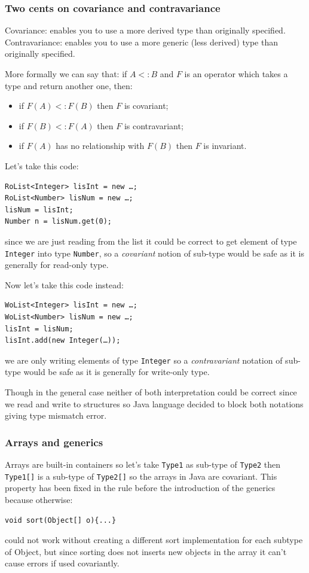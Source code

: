 \subsubsection{Two cents on covariance and contravariance}
Covariance: enables you to use a more derived type than originally specified.
Contravariance: enables you to use a more generic (less derived) type than originally specified.

More formally we can say that: if $A <: B$ and $F$ is an operator which takes a type and return another one, then:
\begin{itemize}
    \item if $F(A) <: F(B)$ then $F$ is covariant;
    \item if $F(B) <: F(A)$ then $F$ is contravariant;
    \item if $F(A)$ has no relationship with $F(B)$ then $F$ is invariant.
\end{itemize}

Let's take this code:
\begin{verbatim}
RoList<Integer> lisInt = new …;
RoList<Number> lisNum = new …;
lisNum = lisInt;
Number n = lisNum.get(0); 
\end{verbatim}
since we are just reading from the list it could be correct to get element of type \verb|Integer| into type \verb|Number|, so a \emph{covariant} notion of sub-type would be safe as it is generally for read-only type.

Now let's take this code instead:
\begin{verbatim}
WoList<Integer> lisInt = new …;
WoList<Number> lisNum = new …;
lisInt = lisNum;
lisInt.add(new Integer(…));
\end{verbatim}
we are only writing elements of type \verb|Integer| so a \emph{contravariant} notation of sub-type would be safe as it is generally for write-only type.

Though in the general case neither of both interpretation could be correct since we read and write to structures so Java language decided to block both notations giving type mismatch error.

\subsubsection{Arrays and generics}
Arrays are built-in containers so let's take \verb|Type1| as sub-type of \verb|Type2| then \verb|Type1[]| is a sub-type of \verb|Type2[]| so the arrays in Java are covariant.
This property has been fixed in the rule before the introduction of the generics because otherwise:
\begin{verbatim}
void sort(Object[] o){...}
\end{verbatim}
could not work without creating a different sort implementation for each subtype of Object, but since sorting does not inserts new objects in the array it can't cause errors if used covariantly.

